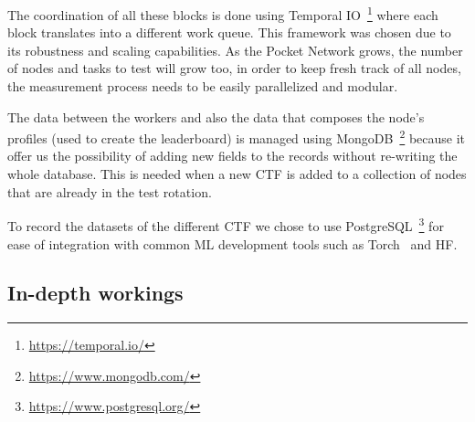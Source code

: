 The coordination of all these blocks is done using Temporal IO~\footnote{\url{https://temporal.io/}} where each block translates into a different work queue. This framework was chosen due to its robustness and scaling capabilities. As the Pocket Network grows, the number of nodes and tasks to test will grow too, in order to keep fresh track of all nodes, the measurement process needs to be easily parallelized and modular.

The data between the workers and also the data that composes the node's profiles (used to create the leaderboard) is managed using MongoDB~\footnote{\url{https://www.mongodb.com/}} because it offer us the possibility of adding new fields to the records without re-writing the whole database. This is needed when a new \gls{CTF} is added to a collection of nodes that are already in the test rotation.

To record the datasets of the different \gls{CTF} we chose to use PostgreSQL~\footnote{\url{https://www.postgresql.org/}} for ease of integration with common \gls{ML} development tools such as Torch~\cite{paszke2017automatic} and \gls{HF}.

\subsection{In-depth workings}

